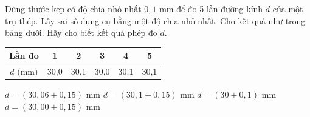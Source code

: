 \begin{vd}
Dùng thước kẹp có độ chia nhỏ nhất $0{,}1\text{ mm}$ để đo 5 lần đường kính $d$ của một trụ thép. Lấy sai số dụng cụ bằng một độ chia nhỏ nhất. Cho kết quả như trong bảng dưới. Hãy cho biết kết quả phép đo $d$.
\begin{center}
\begin{tabular}{|c|c|c|c|c|c|}
\hline
\textbf{Lần đo} & 1 & 2 & 3 & 4 & 5 \\
\hline
$d\text{ (mm)}$ & 30,0 & 30,1 & 30,0 & 30,1 & 30,1 \\
\hline
\end{tabular}
\end{center}
\choice
{\True $d = (30{,}06 \pm 0{,}15)\text{ mm}$}
{$d = (30{,}1 \pm 0{,}15)\text{ mm}$}
{$d = (30 \pm 0{,}1)\text{ mm}$}
{$d = (30{,}00 \pm 0{,}15)\text{ mm}$}
\end{vd}

